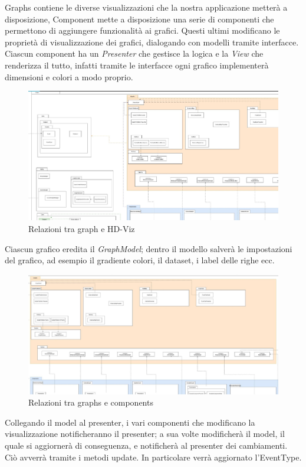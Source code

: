 \documentclass[../manuale_sviluppatore.tex]{subfiles}
\begin{document}
Graphs contiene le diverse visualizzazioni che la nostra applicazione metterà a disposizione, Component mette a disposizione una serie di componenti che permettono di aggiungere funzionalità ai grafici.
Questi ultimi modificano le proprietà di visualizzazione dei grafici, dialogando con modelli tramite interfacce. Ciascun component ha un \emph{Presenter} che gestisce la logica e la \emph{View} che renderizza il tutto,
infatti tramite le interfacce ogni grafico implementerà dimensioni e colori a modo proprio.

\begin{figure}[H]
	\centering
	\includegraphics[width=18cm]{img/graph-e-hdviz.jpg}
	\caption{Relazioni tra graph e HD-Viz}
\end{figure}


Ciascun grafico eredita il \emph{GraphModel}; dentro il modello salverà le impostazioni del grafico, ad esempio il gradiente colori, il dataset, i label delle righe ecc.

\begin{figure}[H]
	\centering
	\includegraphics[width=18cm]{img/graphs-e-components.jpg}
	\caption{Relazioni tra graphs e components}
\end{figure}


Collegando il model al presenter, i vari componenti che modificano la visualizzazione notificheranno il presenter; a sua volte modificherà il model, il quale si aggiornerà di conseguenza, 
e notificherà al presenter dei cambiamenti.
Ciò avverrà tramite i metodi update. In particolare verrà aggiornato l'EventType.
\end{document}
